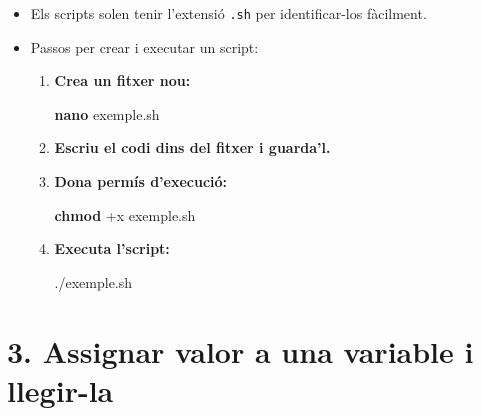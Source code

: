 \documentclass[
  12 pt,
  a4paper,
]{article}
\newenvironment{Shaded}{\begin{snugshade}}{\end{snugshade}}
\newcommand{\ExtensionTok}[1]{#1}
\newcommand{\FunctionTok}[1]{\textcolor[rgb]{0.13,0.29,0.53}{\textbf{#1}}}
\newcommand{\NormalTok}[1]{#1}
\providecommand{\tightlist}{%
  \setlength{\itemsep}{0pt}\setlength{\parskip}{0pt}}
\begin{document}
\begin{itemize}
\tightlist
\item
  Els scripts solen tenir l'extensió \texttt{.sh} per identificar-los
  fàcilment.\\
\item
  Passos per crear i executar un script:

  \begin{enumerate}
  \def\labelenumi{\arabic{enumi}.}
  \item
    \textbf{Crea un fitxer nou:}

\begin{Shaded}
\begin{Highlighting}[]
\FunctionTok{nano}\NormalTok{ exemple.sh}
\end{Highlighting}
\end{Shaded}
  \item
    \textbf{Escriu el codi dins del fitxer i guarda'l.}\\
  \item
    \textbf{Dona permís d'execució:}

\begin{Shaded}
\begin{Highlighting}[]
\FunctionTok{chmod}\NormalTok{ +x exemple.sh}
\end{Highlighting}
\end{Shaded}
  \item
    \textbf{Executa l'script:}

\begin{Shaded}
\begin{Highlighting}[]
\ExtensionTok{./exemple.sh}
\end{Highlighting}
\end{Shaded}
  \end{enumerate}
\end{itemize}

\section{3. Assignar valor a una variable i
llegir-la}\label{assignar-valor-a-una-variable-i-llegir-la}
\end{document}
